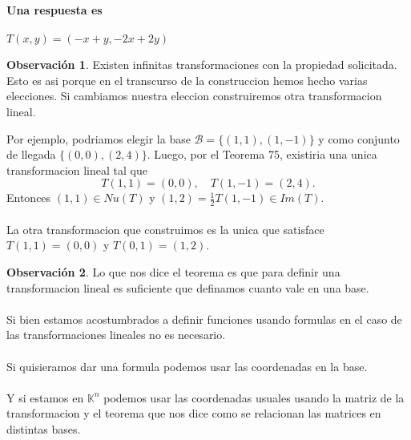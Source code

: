 \documentclass{article}
\theoremstyle{definition}
\theoremstyle{definition}
\newtheorem*{obs}{Observación}
\theoremstyle{remark}
\begin{document}
\textbf{Una respuesta es} \\\\ $T(x,y)=(-x+y,-2x+2y)$ \begin{obs}
  Existen infinitas transformaciones con la propiedad solicitada. Esto es asi porque en el transcurso de la construccion hemos hecho varias elecciones. Si cambiamos nuestra eleccion construiremos otra transformacion lineal. \pagebreak
  
  Por ejemplo, podriamos elegir la base $\mathcal{B}=\{(1,1),(1,-1)\}$ y como conjunto de llegada $\{(0,0),(2,4)\}$. Luego, por el Teorema 75, existiria una unica transformacion lineal tal que \[
T(1,1)=(0,0), \quad T(1,-1)=(2,4).
  \]
  Entonces $(1,1) \in Nu(T)$ y $(1,2)=\frac{1}{2}T(1,-1)\in Im(T)$. \\\\ La otra transformacion que construimos es la unica que satisface $T(1,1)=(0,0)$ y $T(0,1)=(1,2)$.
\end{obs}
\begin{obs}
  Lo que nos dice el teorema es que para definir una transformacion lineal es suficiente que definamos cuanto vale en una base. \\\\ Si bien estamos acostumbrados a definir funciones usando formulas en el caso de las transformaciones lineales no es necesario. \\\\ Si quisieramos dar una formula podemos usar las coordenadas en la base. \\\\ Y si estamos en $\mathbb{K}^n$ podemos usar las coordenadas usuales usando la matriz de la transformacion y el teorema que nos dice como se relacionan las matrices en distintas bases.
\end{obs}
\end{document}
